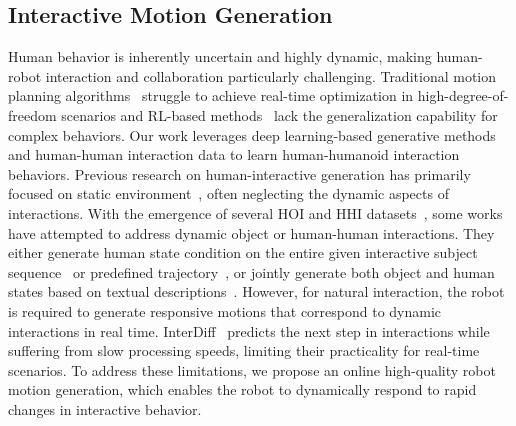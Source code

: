 \subsection{Interactive Motion Generation} 
Human behavior is inherently uncertain and highly dynamic, making human-robot interaction and collaboration particularly challenging. Traditional motion planning algorithms~\cite{dai2014whole} struggle to achieve real-time optimization in high-degree-of-freedom scenarios and RL-based methods~\cite{hwangbo2019learning} lack the generalization capability for complex behaviors. Our work leverages deep learning-based generative methods and human-human interaction data to learn human-humanoid interaction behaviors.
Previous research on human-interactive generation has primarily focused on static environment~\cite{jiang2022chairs,kulkarni2024nifty,jiang2023full}, often neglecting the dynamic aspects of interactions.
With the emergence of several HOI and HHI datasets~\cite{li2023object,bhatnagar2022behave,liang2024intergen}, some works have attempted to address dynamic object or human-human interactions.
They either generate human state condition on the entire given interactive subject sequence~\cite{li2023object,xu2024regennet,cong2025semgeomo} or predefined trajectory~\cite{li2023controllable}, or jointly generate both object and human states based on textual descriptions~\cite{peng2023hoi,diller2024cg,wu2024thor,xu2023interdiff}. 
However, for natural interaction, the robot is required to generate responsive motions that correspond to dynamic interactions in real time. 
InterDiff~\cite{xu2023interdiff} %
predicts the next step in interactions while suffering from slow processing speeds, limiting their practicality for real-time scenarios. 
To address these limitations, we propose an online high-quality robot motion generation, which enables the robot to dynamically respond to rapid changes in interactive behavior.

